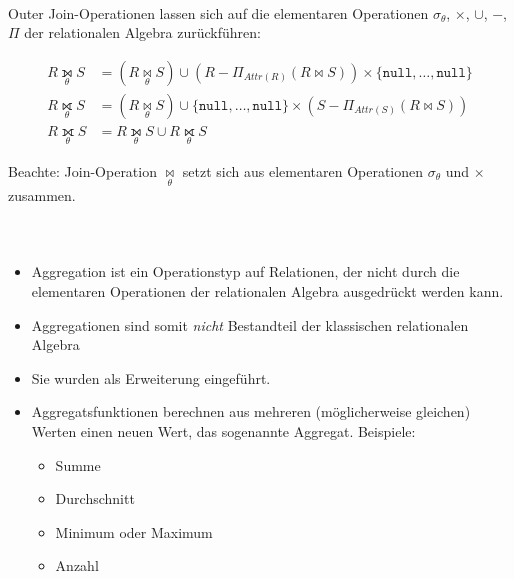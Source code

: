 \begin{frame}
\frametitle{\insertsection}
\framesubtitle{\insertsubsection}
\\[8pt]
Outer Join-Operationen lassen sich auf die elementaren Operationen 
$\sigma_\theta$, $\times$, $\cup$, $-$, $\Pi$ der relationalen Algebra zur\"uckf\"uhren:
\abs
\begin{theorem}
	\begin{equation*}
	\begin{split}
	R\underset{\theta}\leftouterjoin S &= (R\underset{\theta}\Join S) \cup (R - \Pi_{Attr(R)}(R\Join S)) \times 
	\{\texttt{null},\ldots ,\texttt{null}\}\\
	R\underset{\theta}\rightouterjoin S &= (R\underset{\theta}\Join S)\cup \{\texttt{null},\ldots ,\texttt{null}\}\times 
	(S - \Pi_{Attr(S)}(R\Join S))\\
	R\underset{\theta}\fullouterjoin S &= R\underset{\theta}\leftouterjoin S\cup R\underset{\theta}\rightouterjoin S
	\end{split} 
	\end{equation*}
\end{theorem}
\abs
Beachte: Join-Operation $\underset{\theta}\Join$ setzt sich aus elementaren Operationen $\sigma_\theta$ und $\times$ zusammen.
\end{frame}

\begin{frame}
\frametitle{\insertsection}
\framesubtitle{\insertsubsection}
\\[8pt]
\begin{itemize}
	\item Aggregation ist ein Operationstyp auf Relationen, 
	der nicht durch die elementaren Operationen der relationalen Algebra ausgedr\"uckt werden kann.
	\item Aggregationen sind somit \textit{nicht} Bestandteil der klassischen relationalen Algebra
	\item Sie wurden als Erweiterung eingef\"uhrt.
	\item Aggregatsfunktionen berechnen aus mehreren (m\"oglicherweise gleichen) Werten einen neuen Wert, das sogenannte Aggregat.
	Beispiele: 
	\begin{itemize}
		\item Summe
		\item Durchschnitt
		\item Minimum oder Maximum
		\item Anzahl
	\end{itemize}
\end{itemize}
\end{frame}

